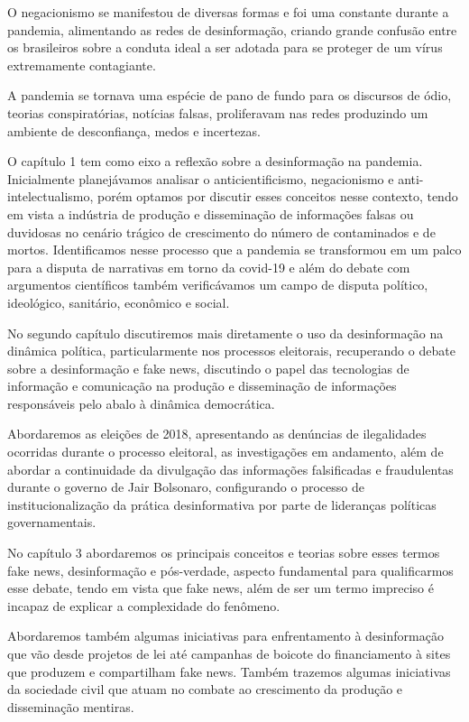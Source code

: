 O negacionismo se manifestou de diversas formas e foi uma constante
durante a pandemia, alimentando as redes de desinformação, criando
grande confusão entre os brasileiros sobre a conduta ideal a ser adotada
para se proteger de um vírus extremamente contagiante.

A pandemia se tornava uma espécie de pano de fundo para os discursos de
ódio, teorias conspiratórias, notícias falsas, proliferavam nas redes
produzindo um ambiente de desconfiança, medos e incertezas.

O capítulo 1 tem como eixo a reflexão sobre a desinformação na pandemia.
Inicialmente planejávamos analisar o anticientificismo, negacionismo e
anti-intelectualismo, porém optamos por discutir esses conceitos nesse
contexto, tendo em vista a indústria de produção e disseminação de
informações falsas ou duvidosas no cenário trágico de crescimento do
número de contaminados e de mortos. Identificamos nesse processo que a
pandemia se transformou em um palco para a disputa de narrativas em
torno da covid-19 e além do debate com argumentos científicos também
verificávamos um campo de disputa político, ideológico, sanitário,
econômico e social.

No segundo capítulo discutiremos mais diretamente o uso da desinformação
na dinâmica política, particularmente nos processos eleitorais,
recuperando o debate sobre a desinformação e fake news, discutindo o
papel das tecnologias de informação e comunicação na produção e
disseminação de informações responsáveis pelo abalo à dinâmica
democrática.

Abordaremos as eleições de 2018, apresentando as denúncias de
ilegalidades ocorridas durante o processo eleitoral, as investigações em
andamento, além de abordar a continuidade da divulgação das informações
falsificadas e fraudulentas durante o governo de Jair Bolsonaro,
configurando o processo de institucionalização da prática desinformativa
por parte de lideranças políticas governamentais.

No capítulo 3 abordaremos os principais conceitos e teorias sobre esses
termos fake news, desinformação e pós-verdade, aspecto fundamental para
qualificarmos esse debate, tendo em vista que fake news, além de ser um
termo impreciso é incapaz de explicar a complexidade do fenômeno.

Abordaremos também algumas iniciativas para enfrentamento à
desinformação que vão desde projetos de lei até campanhas de boicote do
financiamento à sites que produzem e compartilham fake news. Também
trazemos algumas iniciativas da sociedade civil que atuam no combate ao
crescimento da produção e disseminação mentiras.

